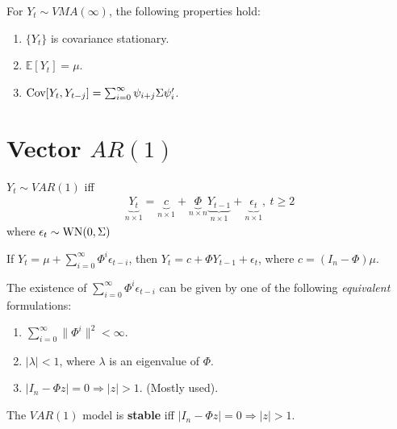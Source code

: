 \documentclass[11pt]{elegantbook}
\begin{document}
\begin{lemma}
    For $Y_t\sim VMA(\infty)$, the following properties hold:
    \begin{enumerate}
        \item $\{Y_t\}$ is covariance stationary.
        \item $\mathbb{E}[Y_t]=\mu$.
        \item $\textnormal{Cov}[Y_t,Y_{t-j}]=\sum_{i=0}^\infty\psi_{i+j}\Sigma\psi_{i}'$.
    \end{enumerate}
\end{lemma}

\section{Vector $AR(1)$}
\begin{definition}[Vector $AR(1)$]
    $Y_t\sim VAR(1)$ iff
    \begin{equation}
        \begin{aligned}
            \underbrace{Y_t}_{n\times 1}=\underbrace{c}_{n\times 1}+\underbrace{\Phi}_{n\times n} \underbrace{Y_{t-1}}_{n\times 1} + \underbrace{\epsilon_t}_{n\times 1},\ t\geq 2
        \end{aligned}
        \nonumber
    \end{equation}
    where $\epsilon_t\sim \textnormal{WN}(0,\Sigma)$
\end{definition}

\begin{lemma}
    If $Y_t=\mu+\sum_{i=0}^\infty\Phi^i\epsilon_{t-i}$, then $Y_t=c+\Phi Y_{t-1} + \epsilon_t$, where $c=(I_n-\Phi)\mu$.
\end{lemma}

\begin{lemma}
    The existence of $\sum_{i=0}^\infty\Phi^i\epsilon_{t-i}$ can be given by one of the following \textit{equivalent} formulations:
    \begin{enumerate}
        \item $\sum_{i=0}^\infty\|\Phi^i\|^2<\infty$.
        \item $|\lambda|<1$, where $\lambda$ is an eigenvalue of $\Phi$.
        \item $|I_n-\Phi z|=0 \Rightarrow |z|>1$. (Mostly used).
    \end{enumerate}
\end{lemma}

\begin{definition}
    The $VAR(1)$ model is \textbf{stable} iff $|I_n-\Phi z|=0 \Rightarrow |z|>1$.
\end{definition}
\end{document}

